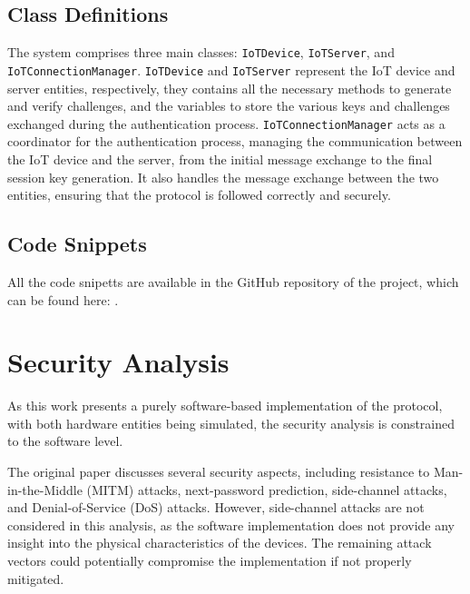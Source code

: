 \documentclass[10pt,twocolumn,letterpaper]{article}
\begin{document}
\subsection{Class Definitions}
The system comprises three main classes: \texttt{IoTDevice}, \texttt{IoTServer}, and \texttt{IoTConnectionManager}.
\texttt{IoTDevice} and \texttt{IoTServer} represent the IoT device and server entities, respectively, they contains all the necessary methods to generate and verify challenges, 
and the variables to store the various keys and challenges exchanged during the authentication process.
\texttt{IoTConnectionManager} acts as a coordinator for the authentication process, managing the communication between the IoT device and the server, from the initial message exchange to the final session key generation.
It also handles the message exchange between the two entities, ensuring that the protocol is followed correctly and securely.

\subsection{Code Snippets}
All the code snipetts are available in the GitHub repository of the project, which can be found here: \cite{bernardi2025cps}.

\section{Security Analysis}
As this work presents a purely software-based implementation of the protocol, with both hardware entities being simulated, the security analysis is constrained to the software level. 

The original paper discusses several security aspects, including resistance to Man-in-the-Middle (MITM) attacks, next-password prediction, side-channel attacks, and Denial-of-Service (DoS) attacks. However, side-channel attacks are not considered in this analysis, as the software implementation does not provide any insight into the physical characteristics of the devices. The remaining attack vectors could potentially compromise the implementation if not properly mitigated.
\end{document}
